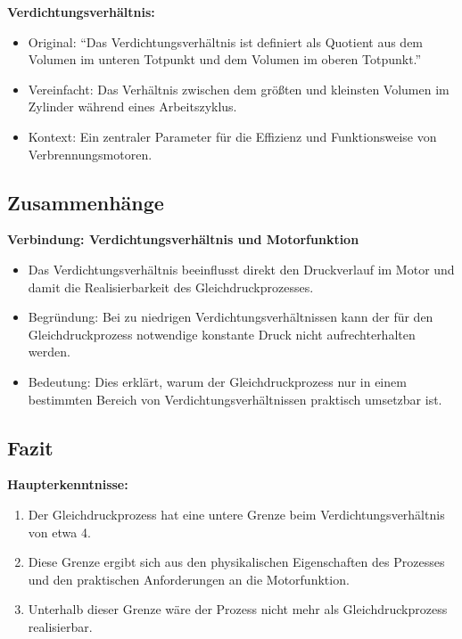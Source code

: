\documentclass[a4paper,12pt]{article}
\begin{document}
\textbf{Verdichtungsverhältnis:}

\begin{itemize}
    \item Original: \enquote{Das Verdichtungsverhältnis ist definiert als Quotient aus dem Volumen im unteren Totpunkt und dem Volumen im oberen Totpunkt.}
    \item Vereinfacht: Das Verhältnis zwischen dem größten und kleinsten Volumen im Zylinder während eines Arbeitszyklus.
    \item Kontext: Ein zentraler Parameter für die Effizienz und Funktionsweise von Verbrennungsmotoren.
\end{itemize}

\subsection{Zusammenhänge}

\textbf{Verbindung: Verdichtungsverhältnis und Motorfunktion}

\begin{itemize}
    \item Das Verdichtungsverhältnis beeinflusst direkt den Druckverlauf im Motor und damit die Realisierbarkeit des Gleichdruckprozesses.
    \item Begründung: Bei zu niedrigen Verdichtungsverhältnissen kann der für den Gleichdruckprozess notwendige konstante Druck nicht aufrechterhalten werden.
    \item Bedeutung: Dies erklärt, warum der Gleichdruckprozess nur in einem bestimmten Bereich von Verdichtungsverhältnissen praktisch umsetzbar ist.
\end{itemize}

\subsection{Fazit}

\textbf{Haupterkenntnisse:}

\begin{enumerate}
    \item Der Gleichdruckprozess hat eine untere Grenze beim Verdichtungsverhältnis von etwa 4.
    \item Diese Grenze ergibt sich aus den physikalischen Eigenschaften des Prozesses und den praktischen Anforderungen an die Motorfunktion.
    \item Unterhalb dieser Grenze wäre der Prozess nicht mehr als Gleichdruckprozess realisierbar.
\end{enumerate}
\end{document}
